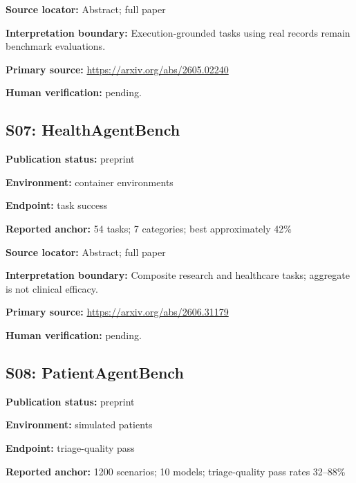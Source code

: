 \documentclass[journal,onecolumn,10pt]{IEEEtran}
\begin{document}
\noindent\textbf{Source locator:} Abstract; full paper\par

\noindent\textbf{Interpretation boundary:} Execution-grounded tasks using real records remain benchmark evaluations.\par

\noindent\textbf{Primary source:} \url{https://arxiv.org/abs/2605.02240}\par
\noindent\textbf{Human verification:} pending.

\subsection*{S07: HealthAgentBench}

\noindent\textbf{Publication status:} preprint\par

\noindent\textbf{Environment:} container environments\par

\noindent\textbf{Endpoint:} task success\par

\noindent\textbf{Reported anchor:} 54 tasks; 7 categories; best approximately 42\%\par

\noindent\textbf{Source locator:} Abstract; full paper\par

\noindent\textbf{Interpretation boundary:} Composite research and healthcare tasks; aggregate is not clinical efficacy.\par

\noindent\textbf{Primary source:} \url{https://arxiv.org/abs/2606.31179}\par
\noindent\textbf{Human verification:} pending.

\subsection*{S08: PatientAgentBench}

\noindent\textbf{Publication status:} preprint\par

\noindent\textbf{Environment:} simulated patients\par

\noindent\textbf{Endpoint:} triage-quality pass\par

\noindent\textbf{Reported anchor:} 1200 scenarios; 10 models; triage-quality pass rates 32–88\%\par
\end{document}
